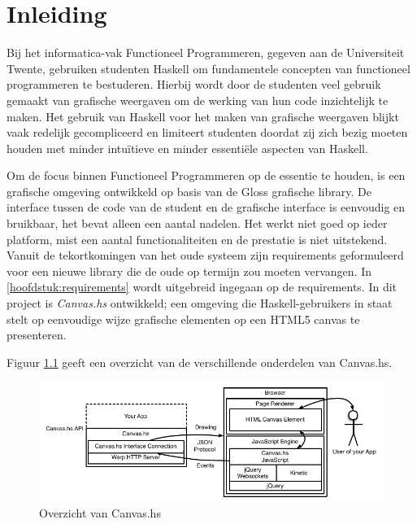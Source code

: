 \chapter{Inleiding}
Bij het informatica-vak Functioneel Programmeren, gegeven aan de Universiteit Twente, gebruiken studenten Haskell om fundamentele concepten van functioneel programmeren te bestuderen. Hierbij wordt door de studenten veel gebruik gemaakt van grafische weergaven om de werking van hun code inzichtelijk te maken. Het gebruik van Haskell voor het maken van grafische weergaven blijkt vaak redelijk gecompliceerd en limiteert studenten doordat zij zich bezig moeten houden met minder intuïtieve en minder essentiële aspecten van Haskell.

Om de focus binnen Functioneel Programmeren op de essentie te houden, is een grafische omgeving ontwikkeld op basis van de Gloss grafische library. De interface tussen de code van de student en de grafische interface is eenvoudig en bruikbaar, het bevat alleen een aantal nadelen. Het werkt niet goed op ieder platform, mist een aantal functionaliteiten en de prestatie is niet uitstekend. Vanuit de tekortkomingen van het oude systeem zijn requirements geformuleerd voor een nieuwe library die de oude op termijn zou moeten vervangen. In \autoref{hoofdstuk:requirements} wordt uitgebreid ingegaan op de requirements.
In dit project is \emph{Canvas.hs} ontwikkeld; een omgeving die Haskell-gebruikers in staat stelt op eenvoudige wijze grafische elementen op een HTML5 canvas te presenteren. 

Figuur \ref{fig:overzicht_canvas.hs} geeft een overzicht van de verschillende onderdelen van Canvas.hs.

\begin{figure}
\begin{center}
\includegraphics[keepaspectratio,width=\textwidth]{./images/architectuur_overzicht.pdf}
\caption{Overzicht  van Canvas.hs}
\label{fig:overzicht_canvas.hs}
\end{center}
\end{figure}

